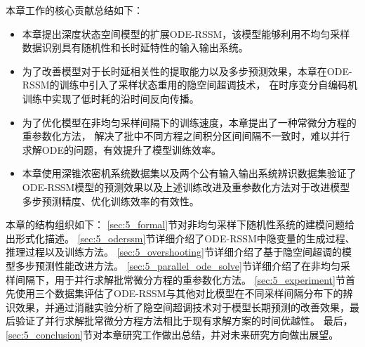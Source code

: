 本章工作的核心贡献总结如下：
\begin{itemize}
    \setlength{\itemsep}{0pt}
    \setlength{\parsep}{0pt}
    \setlength{\parskip}{0pt}
    \setlength{\topsep}{0pt}
    \setlength{\partopsep}{0pt}
\item 本章提出深度状态空间模型的扩展ODE-RSSM，该模型能够利用不均匀采样数据识别具有随机性和长时延特性的输入输出系统。
\item 为了改善模型对于长时延相关性的提取能力以及多步预测效果，本章在ODE-RSSM的训练中引入了采样状态重用的隐空间超调技术，
在时序变分自编码机训练中实现了低时耗的沿时间反向传播。
\item 为了优化模型在非均匀采样间隔下的训练速度，本章提出了一种常微分方程的重参数化方法，
解决了批中不同方程之间积分区间间隔不一致时，难以并行求解ODE的问题，有效提升了模型训练效率。
\item 本章使用深锥浓密机系统数据集以及两个公有输入输出系统辨识数据集验证了ODE-RSSM模型的预测效果以及上述训练改进及重参数化方法对于改进模型多步预测精度、优化训练效率的有效性。
\end{itemize}

本章的结构组织如下：
\ref{sec:5_formal}节对非均匀采样下随机性系统的建模问题给出形式化描述。
\ref{sec:5_oderssm}节详细介绍了ODE-RSSM中隐变量的生成过程、推理过程以及训练方法。
\ref{sec:5_overshooting}节详细介绍了基于隐空间超调的模型多步预测性能改进方法。
\ref{sec:5_parallel_ode_solve}节详细介绍了在非均匀采样间隔下，用于并行求解批常微分方程的重参数化方法。
\ref{sec:5_experiment}节首先使用三个数据集评估了ODE-RSSM与其他对比模型在不同采样间隔分布下的辨识效果，并通过消融实验分析了隐空间超调技术对于模型长期预测的改善效果，最后验证了并行求解批常微分方程方法相比于现有求解方案的时间优越性。
最后，\ref{sec:5_conclusion}节对本章研究工作做出总结，并对未来研究方向做出展望。

